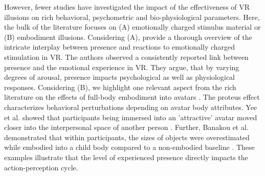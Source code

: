 However, fewer studies have investigated the impact of the effectiveness of VR illusions on rich behavioral, psychometric and bio-physiological parameters. Here, the bulk of the literature focuses on (A) emotionally charged stimulus material or (B) embodiment illusions. Considering (A), \citet{Diemer2015} provide a thorough overview of the intricate interplay between presence and reactions to emotionally charged stimulation in VR. The authors observed a consistently reported link between presence and the emotional experience in VR. They argue, that by varying degrees of arousal, presence impacts psychological as well as physiological responses. Considering (B), we highlight one relevant aspect from the rich literature on the effects of full-body embodiment into avatars \citep{Maister2015}. The proteus effect characterizes behavioral perturbations depending on avatar body attributes. Yee et al. showed that participants being immersed into an 'attractive' avatar moved closer into the interpersonal space of another person \citep{Yee2007}. Further, Banakou et al. demonstrated that within participants, the sizes of objects were overestimated while embodied into a child body compared to a non-embodied baseline \citep{Banakou2013}. These examples illustrate that the level of experienced presence directly impacts the action-perception cycle.
